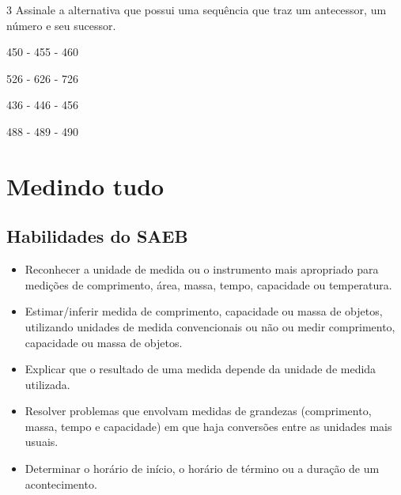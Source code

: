 \num{3} Assinale a alternativa que possui uma sequência que traz um antecessor, um número e seu sucessor.

\begin{escolha}
\item 450 - 455 - 460

\item 526 - 626 - 726

\item 436 - 446 - 456

\item 488 - 489 - 490
\end{escolha}



\chapter{Medindo tudo}

\enlargethispage{3\baselineskip}

\section*{Habilidades do SAEB}

\begin{itemize}
\item Reconhecer a unidade de medida ou o instrumento mais apropriado para
medições de comprimento, área, massa, tempo, capacidade ou temperatura.

\item Estimar/inferir medida de comprimento, capacidade ou massa de objetos,
utilizando unidades de medida convencionais ou não ou medir comprimento,
capacidade ou massa de objetos.

\item Explicar que o resultado de uma medida depende da unidade de medida
utilizada.

\item Resolver problemas que envolvam medidas de grandezas (comprimento,
massa, tempo e capacidade) em que haja conversões entre as unidades mais
usuais.

\item Determinar o horário de início, o horário de término ou a duração de
um acontecimento.
\end{itemize}

